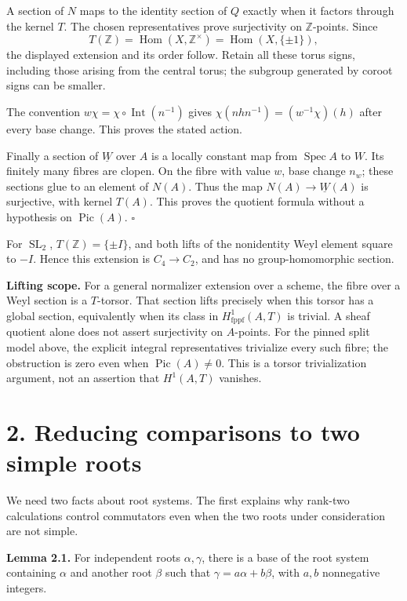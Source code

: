 \documentclass[11pt,a4paper,openany]{report}
\begin{document}
A section of \(N\) maps to the identity section of \(Q\) exactly when it factors through the kernel \(T\). The chosen representatives prove surjectivity on \(\mathbb Z\)-points. Since \[
T(\mathbb Z)=\operatorname{Hom}(X,\mathbb Z^\times)
=\operatorname{Hom}(X,\{\pm1\}),
\] the displayed extension and its order follow. Retain all these torus signs, including those arising from the central torus; the subgroup generated by coroot signs can be smaller.

The convention \(w\chi=\chi\circ\operatorname{Int}(n^{-1})\) gives \(\chi(nhn^{-1})=(w^{-1}\chi)(h)\) after every base change. This proves the stated action.

Finally a section of \(\underline W\) over \(A\) is a locally constant map from \(\operatorname{Spec}A\) to \(W\). Its finitely many fibres are clopen. On the fibre with value \(w\), base change \(n_w\); these sections glue to an element of \(N(A)\). Thus the map \(N(A)\to\underline W(A)\) is surjective, with kernel \(T(A)\). This proves the quotient formula without a hypothesis on \(\operatorname{Pic}(A)\). \(\square\)

For \(\operatorname{SL}_2\), \(T(\mathbb Z)=\{\pm I\}\), and both lifts of the nonidentity Weyl element square to \(-I\). Hence this extension is \(C_4\to C_2\), and has no group-homomorphic section.

\textbf{Lifting scope.} For a general normalizer extension over a scheme, the fibre over a Weyl section is a \(T\)-torsor. That section lifts precisely when this torsor has a global section, equivalently when its class in \(H^1_{\mathrm{fppf}}(A,T)\) is trivial. A sheaf quotient alone does not assert surjectivity on \(A\)-points. For the pinned split model above, the explicit integral representatives trivialize every such fibre; the obstruction is zero even when \(\operatorname{Pic}(A)\ne0\). This is a torsor trivialization argument, not an assertion that \(H^1(A,T)\) vanishes.

\section{2. Reducing comparisons to two simple roots}\label{AG-RG-05-reducing-comparisons-to-two-simple-roots}

We need two facts about root systems. The first explains why rank-two calculations control commutators even when the two roots under consideration are not simple.

\textbf{Lemma 2.1.} For independent roots \(\alpha,\gamma\), there is a base of the root system containing \(\alpha\) and another root \(\beta\) such that \(\gamma=a\alpha+b\beta\), with \(a,b\) nonnegative integers.
\end{document}
